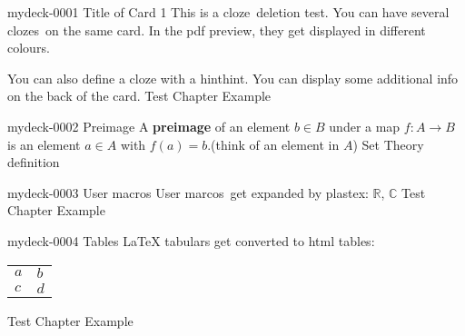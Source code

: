 \documentclass[10pt]{article}
\newcommand{\CC}{\mathbb{C}}
\newcommand{\RR}{\mathbb{R}}
\begin{document}
\begin{note}{mydeck-0001}
  \field Title of Card 1
  \field
  This is a cloze\clend\
  deletion test.  You can have several clozes\clend\ on the same card.
  In the pdf preview, they get displayed in different colours.

  You can also define a cloze with a hint\hint hint\clend.
  \field
  You can display some additional info on the back of the card.
  \field Test Chapter
  \field Example 
\end{note}
 
\begin{note}{mydeck-0002}
  \field Preimage
  \field
  A \textbf{preimage} of an element \(b \in B\) under a map \(f\colon A\to B\) is an element \(a\in A\) with \(f(a) = b\).\hint (think of an element in \(A\))\clend    
  \field  
  \field Set Theory
  \field definition
\end{note}
 
\begin{note}{mydeck-0003}
  \field
  User macros
  \field
  User marcos\clend\ get expanded by plastex: \(\RR\), \(\CC\)
  \field
  \field Test Chapter
  \field Example
\end{note}

\begin{note}{mydeck-0004}
  \field
  Tables
  \field
  LaTeX tabulars get converted to html tables:
  \begin{center}
    \begin{tabular}{ll}
      \(a\) & \(b\) \\
      \(c\) & \(d\)
    \end{tabular}
  \end{center}
  \clend
  \field
  \field Test Chapter
  \field Example
\end{note}
\end{document}
